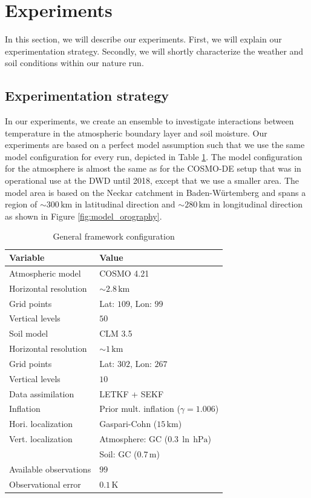 \documentclass[hess, manuscript]{copernicus}
\begin{document}
\section{Experiments}

In this section, we will describe our experiments.
First, we will explain our experimentation strategy.
Secondly, we will shortly characterize the weather and soil conditions within our nature run.

\subsection{Experimentation strategy}

In our experiments, we create an ensemble to investigate interactions between temperature in the atmospheric boundary layer and soil moisture.
Our experiments are based on a perfect model assumption such that we use the same model configuration for every run, depicted in Table \ref{tab:model_config}.
The model configuration for the atmosphere is almost the same as for the COSMO-DE setup that was in operational use at the DWD until 2018, except that we use a smaller area.
The model area is based on the Neckar catchment in Baden-Würtemberg and spans a region of $\sim 300\,\text{km}$ in latitudinal direction and $\sim 280\,\text{km}$ in longitudinal direction as shown in Figure \ref{fig:model_orography}.

\begin{table}[h]
	\caption{General framework configuration\label{tab:model_config}}
	\begin{tabular}{l|l}
		Variable & Value \\ 
		\hline 
		Atmospheric model & COSMO 4.21 \\
		Horizontal resolution & $\sim 2.8\,\text{km}$\\
		Grid points & Lat: $109$, Lon: $99$\\
		Vertical levels & $50$\\
		\hline
		Soil model & CLM 3.5\\
		Horizontal resolution & $\sim 1\,\text{km}$\\
		Grid points & Lat: $302$, Lon: $267$\\
		Vertical levels & $10$\\
		\hline
		Data assimilation & LETKF + SEKF\\
		Inflation & Prior mult. inflation ($\gamma = 1.006$)\\
		Hori. localization & Gaspari-Cohn ($15\,\text{km}$)\\
		Vert. localization & Atmosphere: GC ($0.3\,\ln\,\text{hPa}$)\\
		& Soil: GC ($0.7\,\text{m}$)\\
		Available observations & $99$\\
		Observational error & $0.1\,\text{K}$		
	\end{tabular}
\end{table}
\end{document}
